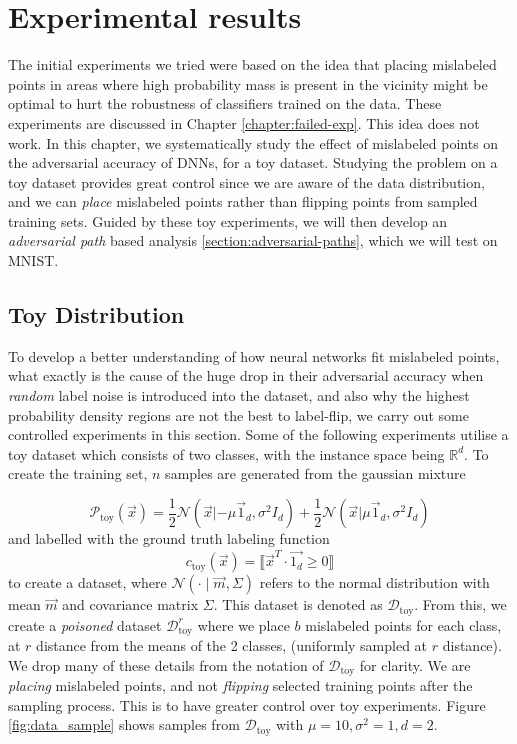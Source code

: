 \documentclass{ociamthesis}
\begin{document}
\chapter{Experimental results}
\label{chapter:experiments}

The initial experiments we tried were based on the idea that placing mislabeled
points in areas where high probability mass is present in the vicinity might be
optimal to hurt the robustness of classifiers trained on the data. These
experiments are discussed in Chapter \ref{chapter:failed-exp}. This idea does
not work. In this chapter, we systematically study the effect of mislabeled
points on the adversarial accuracy of DNNs, for a toy dataset. Studying the
problem on a toy dataset provides great control since we are aware of the data
distribution, and we can \emph{place} mislabeled points rather than flipping
points from sampled training sets. Guided by these toy experiments, we will then
develop an \emph{adversarial path} based analysis
\ref{section:adversarial-paths}, which we will test on MNIST.

\section{Toy Distribution}
\label{section:toy-distribution}

To develop a better understanding of how neural networks fit mislabeled points,
what exactly is the cause of the huge drop in their adversarial accuracy when
\emph{random} label noise is introduced into the dataset, and also why the
highest probability density regions are not the best to label-flip, we carry out
some controlled experiments in this section. Some of the following experiments
utilise a toy dataset which consists of two classes, with the instance space
being $\mathbb{R}^d$. To create the training set, $n$ samples are generated from
the gaussian mixture

\begin{equation*}
    \mathcal{P}_\text{toy}(\vec{x})=\frac{1}{2} \mathcal{N}(\vec{x}|-\mu \vec{1}_d,
    \sigma^2 I_d) + \frac{1}{2} \mathcal{N}(\vec{x}| \mu \vec{1}_d, \sigma^2 I_d)
\end{equation*}
and labelled with the ground truth labeling function 
\begin{equation*}
    c_\text{toy}(\vec{x}) = \llbracket
    \vec{x}^T \cdot\vec{1_d} \geq 0 \rrbracket 
\end{equation*}
to create a dataset, where $\mathcal{N}(\cdot \mid \vec{m}, \Sigma)$ refers to
the normal distribution with mean $\vec{m}$ and covariance matrix $\Sigma$. This
dataset is denoted as $\mathcal{D}_\text{toy}$. From this, we create a
\emph{poisoned} dataset $\mathcal{D}_\text{toy}^r$ where we place $b$ mislabeled
points for each class, at $r$ distance from the means of the 2 classes,
(uniformly sampled at $r$ distance). We drop many of these details from the
notation of $\mathcal{D}_\text{toy}$ for clarity. We are \emph{placing}
mislabeled points, and not \emph{flipping} selected training points after the
sampling process. This is to have greater control over toy experiments. Figure
\ref{fig:data_sample} shows samples from $\mathcal{D}_\text{toy}$ with $\mu=10,
\sigma^2=1, d=2$.
\end{document}
